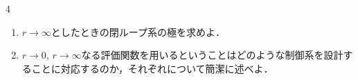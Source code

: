 \begin{multicols}{4}
\begin{enumerate}
\begin{enumerate}
\item
$r \rightarrow \infty$としたときの閉ループ系の極を求めよ．
\vspace{2cm}

\item
$r\rightarrow 0$, $r \rightarrow \infty$なる評価関数を用いるということはどのような制御系を設計することに対応するのか，それぞれについて簡潔に述べよ．
\vspace{3cm}
\end{enumerate}





\end{enumerate}
\end{multicols}
